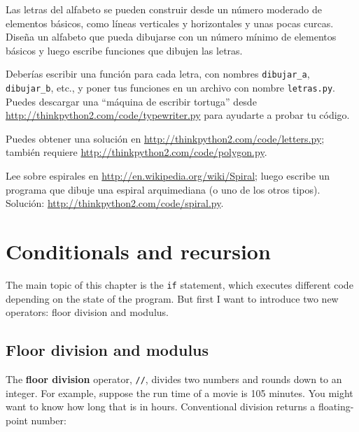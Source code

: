\documentclass[10pt]{book}
\begin{document}
\begin{exercise}

Las letras del alfabeto se pueden construir desde un número moderado
de elementos básicos, como líneas verticales y horizontales y unas pocas
curcas.  Diseña un alfabeto que pueda dibujarse con un número
mínimo de elementos básicos y luego escribe funciones que dibujen las letras.

Deberías escribir una función para cada letra, con nombres
\verb"dibujar_a", \verb"dibujar_b", etc., y poner tus funciones
en un archivo con nombre {\tt letras.py}.  Puedes descargar una
``máquina de escribir tortuga'' desde \url{http://thinkpython2.com/code/typewriter.py}
para ayudarte a probar tu código.

Puedes obtener una solución en \url{http://thinkpython2.com/code/letters.py};
también requiere
\url{http://thinkpython2.com/code/polygon.py}.

\end{exercise}

\begin{exercise}

Lee sobre espirales en \url{http://en.wikipedia.org/wiki/Spiral}; luego
escribe un programa que dibuje una espiral arquimediana (o uno de los otros
tipos).  Solución: \url{http://thinkpython2.com/code/spiral.py}.

\end{exercise}


\chapter{Conditionals and recursion}

The main topic of this chapter is the {\tt if} statement, which
executes different code depending on the state of the program.
But first I want to introduce two new operators: floor division
and modulus.


\section{Floor division and modulus}

The {\bf floor division} operator, \verb"//", divides
two numbers and rounds down to an integer.  For example, suppose the
run time of a movie is 105 minutes.  You might want to know how
long that is in hours.  Conventional division
returns a floating-point number:
\end{document}
